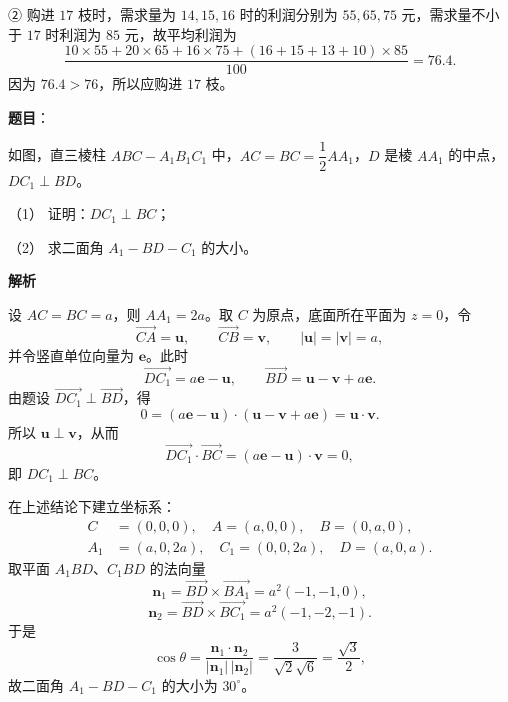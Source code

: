 \begin{answer}
② 购进 $17$ 枝时，需求量为 $14,15,16$ 时的利润分别为 $55,65,75$ 元，需求量不小于 $17$ 时利润为 $85$ 元，故平均利润为
\nopagebreak[4]
\[
\frac{10\times55+20\times65+16\times75+(16+15+13+10)\times85}{100}=76.4.
\]
因为 $76.4>76$，所以应购进 $17$ 枝。



\end{answer}
\begin{answer}

\textbf{题目}：

如图，直三棱柱 $ABC-A_1B_1C_1$ 中，$AC=BC=\dfrac12AA_1$，$D$ 是棱 $AA_1$ 的中点，$DC_1\perp BD$。
\nopagebreak[4]
\begin{center}\end{center}
\nopagebreak[4]
（1） 证明：$DC_1\perp BC$；

（2） 求二面角 $A_1-BD-C_1$ 的大小。

\textbf{解析}


设 $AC=BC=a$，则 $AA_1=2a$。取 $C$ 为原点，底面所在平面为 $z=0$，令
\nopagebreak[4]
\[
\overrightarrow{CA}=\boldsymbol u,\qquad
\overrightarrow{CB}=\boldsymbol v,\qquad
|\boldsymbol u|=|\boldsymbol v|=a,
\]
并令竖直单位向量为 $\boldsymbol e$。此时
\nopagebreak[4]
\[
\overrightarrow{DC_1}=a\boldsymbol e-\boldsymbol u,\qquad
\overrightarrow{BD}=\boldsymbol u-\boldsymbol v+a\boldsymbol e.
\]
由题设 $\overrightarrow{DC_1}\perp\overrightarrow{BD}$，得
\nopagebreak[4]
\[
0=(a\boldsymbol e-\boldsymbol u)\cdot
(\boldsymbol u-\boldsymbol v+a\boldsymbol e)
=\boldsymbol u\cdot\boldsymbol v.
\]
所以 $\boldsymbol u\perp\boldsymbol v$，从而
\nopagebreak[4]
\[
\overrightarrow{DC_1}\cdot\overrightarrow{BC}
=(a\boldsymbol e-\boldsymbol u)\cdot\boldsymbol v=0,
\]
即 $DC_1\perp BC$。


在上述结论下建立坐标系：
\nopagebreak[4]
\[
\begin{aligned}
C&=(0,0,0),\quad A=(a,0,0),\quad B=(0,a,0),\\
A_1&=(a,0,2a),\quad C_1=(0,0,2a),\quad D=(a,0,a).
\end{aligned}
\]
取平面 $A_1BD$、$C_1BD$ 的法向量
\nopagebreak[4]
\[
\boldsymbol n_1=\overrightarrow{BD}\times\overrightarrow{BA_1}
=a^2(-1,-1,0),
\]
\nopagebreak[4]
\[
\boldsymbol n_2=\overrightarrow{BD}\times\overrightarrow{BC_1}
=a^2(-1,-2,-1).
\]
于是
\nopagebreak[4]
\[
\cos\theta=\frac{\boldsymbol n_1\cdot\boldsymbol n_2}
{|\boldsymbol n_1|\,|\boldsymbol n_2|}
=\frac{3}{\sqrt2\sqrt6}=\frac{\sqrt3}{2},
\]
故二面角 $A_1-BD-C_1$ 的大小为 $30^\circ$。


\end{answer}
